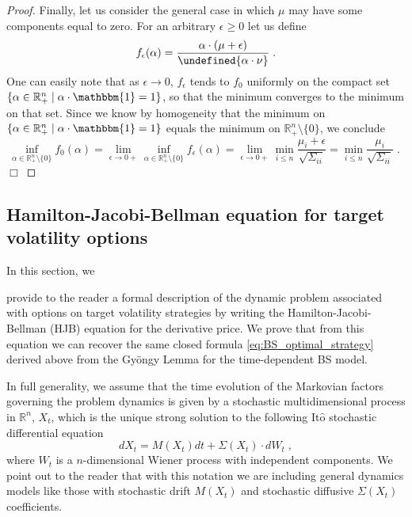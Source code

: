\documentclass[runningheads]{m2ef}
\let\norm\undefined %
\DeclarePairedDelimiter\norm{\lVert}{\rVert}
\newcommand\soutpars[1]{\let\helpcmd\sout\parhelp#1\par\relax\relax}
\newcommand{\remove}[1]{{\color{red} \soutpars{{#1}}}}%
\begin{document}
\begin{proof}
		Finally, let us consider the general case in which $\mu$ may have some components equal to zero. For an arbitrary $\epsilon \geq 0$ let us define
		\begin{equation}
		f_{\epsilon}(\alpha) = \frac{\alpha \cdot (\mu+\epsilon)}{\norm{\alpha \cdot \nu}} \; .
		\end{equation}
		One can easily note that as $\epsilon \to 0$, $f_{\epsilon}$ tends to $f_{0}$ uniformly on the compact set $\{\alpha \in \mathbb{R}^n_+ \mid \alpha \cdot \mathbbm{1} = 1\}$, so that the minimum converges to the minimum on that set. Since we know by homogeneity that the minimum on $\{\alpha \in \mathbb{R}^n_+ \mid \alpha \cdot \mathbbm{1} = 1\}$ equals the minimum on $\mathbb{R}^n_+ \setminus \{0\}$, we conclude
		\begin{equation}
		\inf_{\alpha \in \mathbb{R}_{+}^n \setminus \{0\}} f_0(\alpha) = 
		\lim_{\epsilon \to 0+} \inf_{\alpha \in \mathbb{R}_{+}^n \setminus \{0\}} f_{\epsilon}(\alpha) = 
		\lim_{\epsilon \to 0+} \min_{i\leq n} \frac{\mu_i+\epsilon}{\sqrt{\Sigma_{ii}}} =
		\min_{i\leq n} \frac{\mu_i}{\sqrt{\Sigma_{ii}}} \; . \; 
		\end{equation} $\Box$
	\end{proof}


	\subsection{Hamilton-Jacobi-Bellman equation for target volatility options}\label{subsec:HJB}
	In this section, we \remove{want to} provide to the reader a formal description of the dynamic problem associated with options on target volatility strategies by writing the Hamilton-Jacobi-Bellman (HJB) equation for the derivative price. We prove that from this equation we can recover the same closed formula \eqref{eq:BS_optimal_strategy} derived above from the Gy\"ongy Lemma for the time-dependent BS model. 

	In full generality, we assume that the time evolution of the Markovian factors governing the problem dynamics is given by  a stochastic multidimensional process in $\mathbb{R}^n$, $X_t$, which is the unique strong solution to the following It$\hat{\text{o}}$ stochastic differential equation 
	\begin{equation}
			dX_t = M(X_t)dt + \Sigma(X_t) \cdot dW_t \; ,
	\end{equation}
	where $W_t$ is a $n$-dimensional Wiener process with independent components. We point out to the reader that with this notation we are including general dynamics models like those with stochastic drift $M(X_t)$ and stochastic diffusive $\Sigma(X_t)$ coefficients. 
\end{document}
